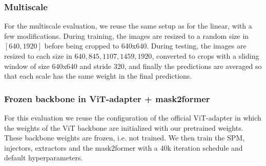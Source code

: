 \subsubsection{Multiscale}
For the multiscale evaluation, we reuse the same setup as for the linear, with a few modifications. During training, the images are resized to a random size in $[640, 1920]$ before being cropped to 640x640. During testing, the images are resized to each size in ${640, 845, 1107, 1459, 1920}$, converted to crops with a sliding window of size 640x640 and stride 320, and finally the predictions are averaged so that each scale has the same weight in the final predictions.

\subsubsection{Frozen backbone in ViT-adapter + mask2former}
For this evaluation we reuse the configuration of the official ViT-adapter \cite{chen2022vision} in which the weights of the ViT backbone are initialized with our pretrained weights. These backbone weights are frozen, i.e. not trained. We then train the SPM, injectors, extractors and the mask2former with a 40k iteration schedule and default hyperparameters.



